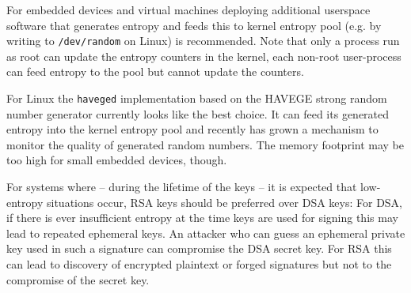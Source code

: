 For embedded devices and virtual machines deploying additional userspace
software that generates entropy and feeds this to kernel entropy pool
(e.g. by writing to \verb+/dev/random+ on Linux) is recommended. Note
that only a process run as root can update the entropy counters in the
kernel, each non-root user-process can feed entropy to the pool but
cannot update the counters\cite{Wikipedia:/dev/random}.

For Linux the \verb+haveged+
implementation\cite{HAV13a} based on the HAVEGE\cite{SS03}
strong random number generator currently looks like the best choice. It
can feed its generated entropy into the kernel entropy pool and recently
has grown a mechanism to monitor the quality of generated random
numbers\cite{HAV13b}. The memory footprint may be too high for small
embedded devices, though.

For systems where -- during the lifetime of the keys -- it is expected
that low-entropy situations occur, RSA keys should be preferred over DSA
keys: For DSA, if there is ever insufficient entropy at the time keys
are used for signing this may lead to repeated ephemeral keys. An
attacker who can guess an ephemeral private key used in such a signature
can compromise the DSA secret key.
For RSA this can lead to discovery of encrypted plaintext or forged
signatures but not to the compromise of the secret key\cite{HDWH12}.
